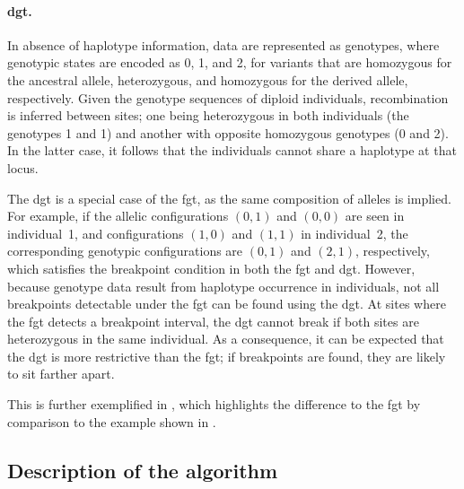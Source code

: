 \paragraph{\Gls{dgt}.}
In absence of haplotype information, data are represented as genotypes, where genotypic states are encoded as 0, 1, and 2, for variants that are homozygous for the ancestral allele, heterozygous, and homozygous for the derived allele, respectively.
Given the genotype sequences of  diploid individuals, recombination is inferred between  sites; one being heterozygous in both individuals (\ie the genotypes 1 and 1) and another with opposite homozygous genotypes (0 and 2).
In the latter case, it follows that the  individuals cannot share a haplotype at that locus.

The \gls{dgt} is a special case of the \gls{fgt}, as the same composition of alleles is implied.
For example, if the allelic configurations ${(0,1)}$ and ${(0,0)}$ are seen in individual~1, and configurations ${(1,0)}$ and ${(1,1)}$ in individual~2, the corresponding genotypic configurations are ${(0,1)}$ and ${(2,1)}$, respectively, which satisfies the breakpoint condition in both the \gls{fgt} and \gls{dgt}.
However, because genotype data result from haplotype occurrence in individuals, not all breakpoints detectable under the \gls{fgt} can be found using the \gls{dgt}.
At sites where the \gls{fgt} detects a breakpoint interval, the \gls{dgt} cannot break if both sites are heterozygous in the same individual.
As a consequence, it can be expected that the \gls{dgt} is more restrictive than the \gls{fgt}; \eg if breakpoints are found, they are likely to sit farther apart.

%

%

This is further exemplified in , which highlights the difference to the \gls{fgt} by comparison to the example shown in .


%
\subsection{Description of the algorithm}\label{sec:ibd_detect_alg}
%

